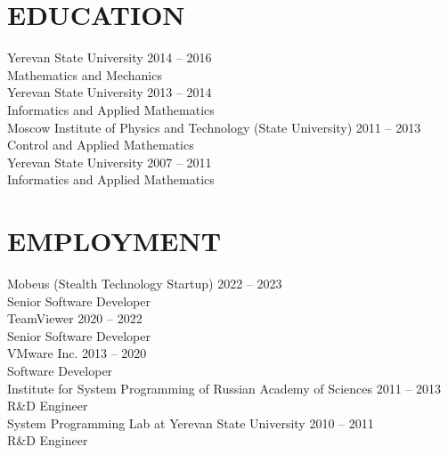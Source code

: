 \documentclass[10pt]{res}
\begin{document}
\begin{resume}


\section{EDUCATION}
\vspace{5pt}
	Yerevan State University \hfill 2014 -- 2016 \yearpostfix \\
	Mathematics and Mechanics \vspace{5pt} \\
	Yerevan State University \hfill 2013 -- 2014 \yearpostfix \\
	Informatics and Applied Mathematics \vspace{5pt} \\
	Moscow Institute of Physics and Technology (State University) \hfill 2011 -- 2013 \yearpostfix \\
	Control and Applied Mathematics \vspace{5pt} \\
	Yerevan State University \hfill 2007 -- 2011 \yearpostfix \\
	Informatics and Applied Mathematics

\section{EMPLOYMENT}
\vspace{5pt}
	Mobeus (Stealth Technology Startup) \hfill 2022 -- 2023 \yearpostfix \\ %
	Senior Software Developer \vspace{5pt} \\
	TeamViewer \hfill 2020 -- 2022 \yearpostfix \\
	Senior Software Developer \vspace{5pt} \\
	VMware Inc. \hfill 2013 -- 2020 \yearpostfix \\
	Software Developer \vspace{5pt} \\
	Institute for System Programming of Russian Academy of Sciences \hfill 2011 -- 2013 \yearpostfix \\%
	R\&D Engineer \vspace{5pt} \\
	System Programming Lab at Yerevan State University \hfill 2010 -- 2011 \yearpostfix \\
	R\&D Engineer


\end{resume}
\end{document}
